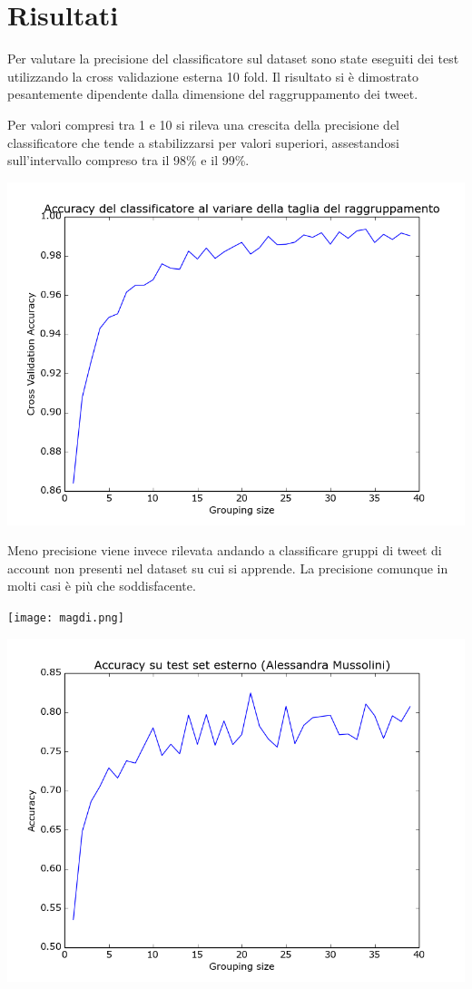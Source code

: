 \documentclass{article}
\begin{document}
\section{Risultati} 

Per valutare la precisione del classificatore sul dataset sono state eseguiti dei test utilizzando la cross validazione esterna 10 fold. Il risultato si è dimostrato pesantemente dipendente dalla dimensione del raggruppamento dei tweet. 

Per valori compresi tra 1 e 10 si rileva una crescita della precisione del classificatore che tende a stabilizzarsi per valori superiori, assestandosi sull'intervallo compreso tra il 98\% e il 99\%.

\includegraphics[width=\linewidth]{grouping.png}

Meno precisione viene invece rilevata andando a classificare gruppi di tweet di account non presenti nel dataset su cui si apprende. La precisione comunque in molti casi è più che soddisfacente. 

\texttt{[image: magdi.png]}

\includegraphics[width=\linewidth]{musso.png}
\end{document}
